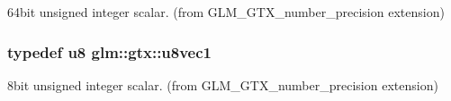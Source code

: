 64bit unsigned integer scalar. (from G\+L\+M\+\_\+\+G\+T\+X\+\_\+number\+\_\+precision extension) 

\hypertarget{group__gtx__number__precision_ga35ae7849593a354420e4f52d1b36c2d6}{}
\subsubsection[{u8vec1}]{\setlength{\rightskip}{0pt plus 5cm}typedef u8 {\bf glm\+::gtx\+::u8vec1}}\label{group__gtx__number__precision_ga35ae7849593a354420e4f52d1b36c2d6}


8bit unsigned integer scalar. (from G\+L\+M\+\_\+\+G\+T\+X\+\_\+number\+\_\+precision extension) 

